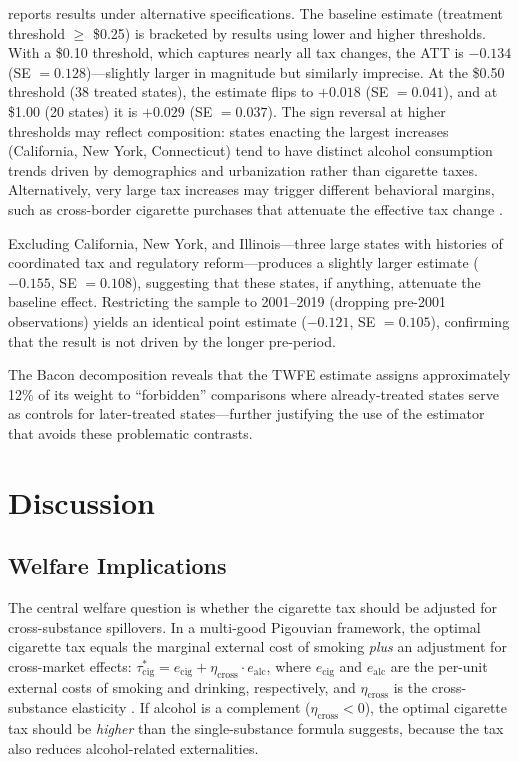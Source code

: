 \documentclass[12pt]{article}
\begin{document}
 reports results under alternative specifications. The baseline estimate (treatment threshold $\geq$ \$0.25) is bracketed by results using lower and higher thresholds. With a \$0.10 threshold, which captures nearly all tax changes, the ATT is $-0.134$ (SE $= 0.128$)---slightly larger in magnitude but similarly imprecise. At the \$0.50 threshold (38 treated states), the estimate flips to $+0.018$ (SE $= 0.041$), and at \$1.00 (20 states) it is $+0.029$ (SE $= 0.037$). The sign reversal at higher thresholds may reflect composition: states enacting the largest increases (California, New York, Connecticut) tend to have distinct alcohol consumption trends driven by demographics and urbanization rather than cigarette taxes. Alternatively, very large tax increases may trigger different behavioral margins, such as cross-border cigarette purchases that attenuate the effective tax change \citep{harding2012alcohol}.

Excluding California, New York, and Illinois---three large states with histories of coordinated tax and regulatory reform---produces a slightly larger estimate ($-0.155$, SE $= 0.108$), suggesting that these states, if anything, attenuate the baseline effect. Restricting the sample to 2001--2019 (dropping pre-2001 observations) yields an identical point estimate ($-0.121$, SE $= 0.105$), confirming that the result is not driven by the longer pre-period.

The Bacon decomposition reveals that the TWFE estimate assigns approximately 12\% of its weight to ``forbidden'' comparisons where already-treated states serve as controls for later-treated states---further justifying the use of the \citet{callaway2021difference} estimator that avoids these problematic contrasts.




\section{Discussion}
\label{sec:discussion}

\subsection{Welfare Implications}

The central welfare question is whether the cigarette tax should be adjusted for cross-substance spillovers. In a multi-good Pigouvian framework, the optimal cigarette tax equals the marginal external cost of smoking \textit{plus} an adjustment for cross-market effects: $\tau^*_{\text{cig}} = e_{\text{cig}} + \eta_{\text{cross}} \cdot e_{\text{alc}}$, where $e_{\text{cig}}$ and $e_{\text{alc}}$ are the per-unit external costs of smoking and drinking, respectively, and $\eta_{\text{cross}}$ is the cross-substance elasticity \citep{gruber2005sin}. If alcohol is a complement ($\eta_{\text{cross}} < 0$), the optimal cigarette tax should be \textit{higher} than the single-substance formula suggests, because the tax also reduces alcohol-related externalities.
\end{document}
